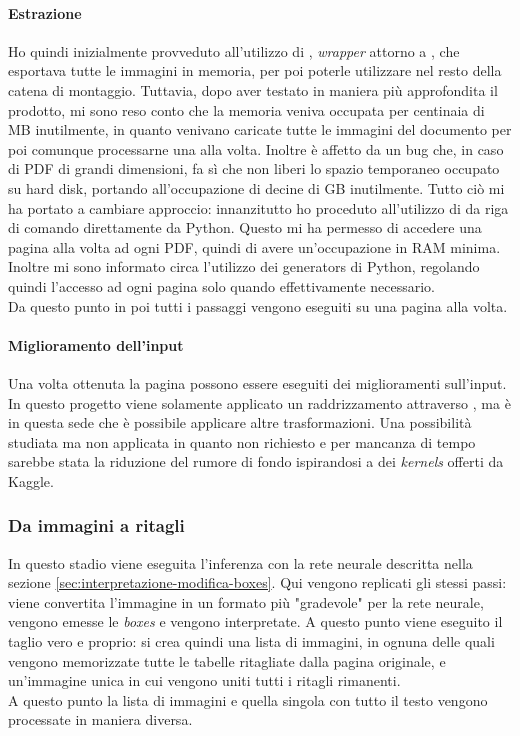             \paragraph{Estrazione}
            Ho quindi inizialmente provveduto all'utilizzo di \cite{prod:wand}, \textit{wrapper} attorno a \cite{prod:imagemagik}, che esportava tutte le immagini in memoria, per poi poterle utilizzare nel resto della catena di montaggio. Tuttavia, dopo aver testato in maniera più approfondita il prodotto, mi sono reso conto che la memoria veniva occupata per centinaia di MB inutilmente, in quanto venivano caricate tutte le immagini del documento per poi comunque processarne una alla volta. Inoltre  è affetto da un bug che, in caso di PDF di grandi dimensioni, fa sì che non liberi lo spazio temporaneo occupato su hard disk, portando all'occupazione di decine di GB inutilmente. Tutto ciò mi ha portato a cambiare approccio: innanzitutto ho proceduto all'utilizzo di \cite{prod:pdftoppm} da riga di comando direttamente da Python. Questo mi ha permesso di accedere una pagina alla volta ad ogni PDF, quindi di avere un'occupazione in RAM minima. Inoltre mi sono informato circa l'utilizzo dei \gls{generators} di Python, regolando quindi l'accesso ad ogni pagina solo quando effettivamente necessario.
            \medskip
            \\Da questo punto in poi tutti i passaggi vengono eseguiti su una pagina alla volta.
            \paragraph{Miglioramento dell'input}
            Una volta ottenuta la pagina possono essere eseguiti dei miglioramenti sull'input. In questo progetto viene solamente applicato un raddrizzamento attraverso \cite{prod:alyn}, ma è in questa sede che è possibile applicare altre trasformazioni. Una possibilità studiata ma non applicata in quanto non richiesto e per mancanza di tempo sarebbe stata la riduzione del rumore di fondo ispirandosi a dei \textit{kernels}\cite{site:denoysing-dirty-documents} offerti da Kaggle\cite{site:kaggle}.
        \subsubsection{Da immagini a ritagli}
        In questo stadio viene eseguita l'inferenza con la rete neurale descritta nella sezione \ref{sec:interpretazione-modifica-boxes}. Qui vengono replicati gli stessi passi: viene convertita l'immagine in un formato più "gradevole" per la rete neurale, vengono emesse le \textit{boxes} e vengono interpretate. A questo punto viene eseguito il taglio vero e proprio: si crea quindi una lista di immagini, in ognuna delle quali vengono memorizzate tutte le tabelle ritagliate dalla pagina originale, e un'immagine unica in cui vengono uniti tutti i ritagli rimanenti.
        \medskip
        \\A questo punto la lista di immagini e quella singola con tutto il testo vengono processate in maniera diversa.
